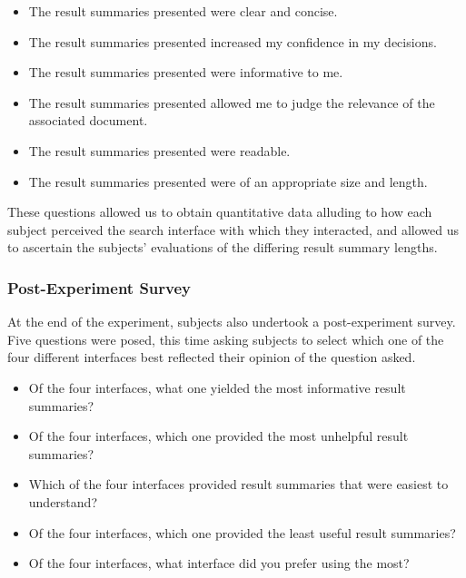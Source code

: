 \begin{itemize}
    \item{ The result summaries presented were clear and concise.}
    \item{ The result summaries presented increased my confidence in my decisions.}
    \item{ The result summaries presented were informative to me.}
    \item{ The result summaries presented allowed me to judge the relevance of the associated document.}
    \item{ The result summaries presented were readable.}
    \item{ The result summaries presented were of an appropriate size and length.}
\end{itemize}

These questions allowed us to obtain quantitative data alluding to how each subject perceived the search interface with which they interacted, and allowed us to ascertain the subjects' evaluations of the differing result summary lengths.

\subsubsection{Post-Experiment Survey}\label{sec:snippets:method:postexperiment}
At the end of the experiment, subjects also undertook a post-experiment survey. Five questions were posed, this time asking subjects to select which one of the four different interfaces best reflected their opinion of the question asked.

\begin{itemize}
    \item{ Of the four interfaces, what one yielded the most informative result summaries?}
    \item{ Of the four interfaces, which one provided the most unhelpful result summaries?}
    \item{ Which of the four interfaces provided result summaries that were easiest to understand?}
    \item{ Of the four interfaces, which one provided the least useful result summaries?}
    \item{ Of the four interfaces, what interface did you prefer using the most?}
\end{itemize}


